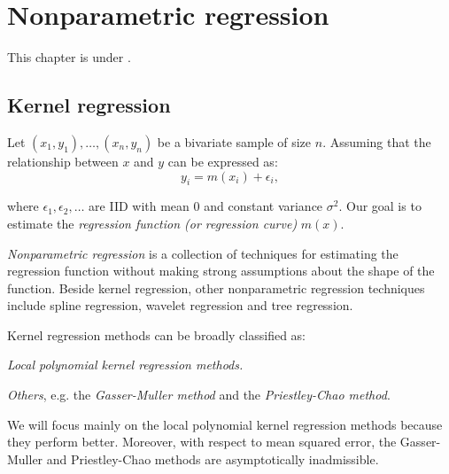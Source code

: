 \chapter{Nonparametric regression}
This chapter is under \work.
\section{Kernel regression}
Let $(x_1,y_1),\ldots,(x_n,y_n)$ be a bivariate sample of size $n$. Assuming that the relationship between $x$ and $y$ can be expressed as:
\begin{equation}
y_i=m(x_i)+\epsilon_i,
\end{equation}

where $\epsilon_1,\epsilon_2,\ldots$ are IID with mean 0 and constant variance $\sigma^2$. Our goal is to estimate the {\it regression function (or regression curve)} $m(x)$.

{\it Nonparametric regression} is a collection of techniques for estimating the regression function without making strong assumptions about the shape of the function. Beside kernel regression, other nonparametric regression techniques include spline regression, wavelet regression and tree regression.

Kernel regression methods can be broadly classified as:
\begin{asparaenum}[(a)]
\item {\it Local polynomial kernel regression methods.}

\item {\it Others}, e.g. the {\it Gasser-Muller method} and the {\it Priestley-Chao method}.
\end{asparaenum}
We will focus mainly on the local polynomial kernel regression methods because they perform better. Moreover, with respect to mean squared error, the Gasser-Muller and Priestley-Chao methods are asymptotically inadmissible.

